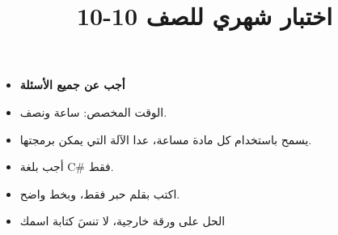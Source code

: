 \documentclass[14pt]{extarticle}
\title{اختبار شهري للصف 10-10}
\begin{document}
\maketitle

\ifwithsols
\else
\begin{boxCode}
    \begin{itemize}[nosep]
        \item \textbf{أجب عن جميع الأسئلة}
        \item الوقت المخصص: ساعة ونصف.
        \item يسمح باستخدام كل مادة مساعة، عدا الآلة التي يمكن برمجتها.
        \item أجب بلغة \textenglish{C\#} فقط.
        \item اكتب بقلم حبر فقط، وبخط واضح.
        \item الحل على ورقة خارجية، لا تنسَ كتابة اسمك
    \end{itemize}
\end{boxCode}
\fi

\vspace{1cm}
\end{document}
